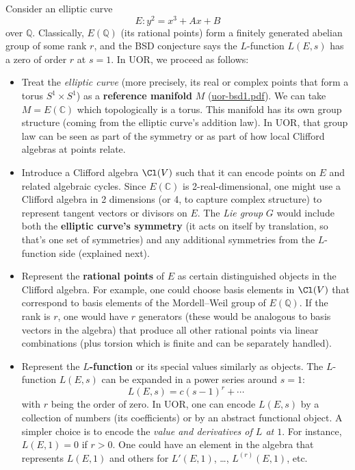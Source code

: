 \documentclass[12pt]{article}
\begin{document}
Consider an elliptic curve 
\[
E: y^2 = x^3 + Ax + B
\]
over $\mathbb{Q}$. Classically, $E(\mathbb{Q})$ (its rational points) form a finitely generated abelian group of some rank $r$, and the BSD conjecture says the $L$-function $L(E,s)$ has a zero of order $r$ at $s=1$. In UOR, we proceed as follows:
\begin{itemize}[leftmargin=*, label={--}]
    \item Treat the \emph{elliptic curve} (more precisely, its real or complex points that form a torus $S^1\times S^1$) as a \textbf{reference manifold} $M$ (\href{file://file-QX2RAaHV3sY1bCttwB4hkL#:~:text=,of%20%24E%24%20as%20a%20Lie}{uor-bsd1.pdf}). We can take $M = E(\mathbb{C})$ which topologically is a torus. This manifold has its own group structure (coming from the elliptic curve’s addition law). In UOR, that group law can be seen as part of the symmetry or as part of how local Clifford algebras at points relate.
    \item Introduce a Clifford algebra $\Cl(V)$ such that it can encode points on $E$ and related algebraic cycles. Since $E(\mathbb{C})$ is 2-real-dimensional, one might use a Clifford algebra in 2 dimensions (or 4, to capture complex structure) to represent tangent vectors or divisors on $E$. The \emph{Lie group} $G$ would include both the \textbf{elliptic curve’s symmetry} (it acts on itself by translation, so that’s one set of symmetries) and any additional symmetries from the $L$-function side (explained next).
    \item Represent the \textbf{rational points} of $E$ as certain distinguished objects in the Clifford algebra. For example, one could choose basis elements in $\Cl(V)$ that correspond to basis elements of the Mordell--Weil group of $E(\mathbb{Q})$. If the rank is $r$, one would have $r$ generators (these would be analogous to basis vectors in the algebra) that produce all other rational points via linear combinations (plus torsion which is finite and can be separately handled).
    \item Represent the \textbf{$L$-function} or its special values similarly as objects. The $L$-function $L(E,s)$ can be expanded in a power series around $s=1$: 
    \[
    L(E,s) = c (s-1)^r + \cdots
    \]
    with $r$ being the order of zero. In UOR, one can encode $L(E,s)$ by a collection of numbers (its coefficients) or by an abstract functional object. A simpler choice is to encode the \emph{value and derivatives of $L$ at $1$}. For instance, $L(E,1) = 0$ if $r>0$. One could have an element in the algebra that represents $L(E,1)$ and others for $L'(E,1)$, \dots, $L^{(r)}(E,1)$, etc.
\end{itemize}
\end{document}
